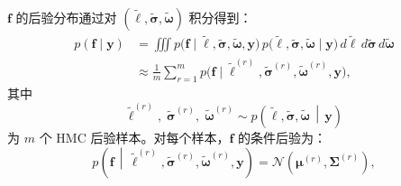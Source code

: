 \documentclass[]{interact}
\theoremstyle{plain}%
\theoremstyle{definition}
\theoremstyle{remark}
\begin{document}
$\mathbf{f}$ 的后验分布通过对 $(\tilde{\boldsymbol{\ell}}, \tilde{\boldsymbol{\sigma}}, \tilde{\boldsymbol{\omega}})$ 积分得到：
\begin{equation}
		\begin{aligned}
			p(\mathbf{f}\mid \mathbf{y})
			&= \iiint
			p\bigl(\mathbf{f}\mid \widetilde{\boldsymbol{\ell}},\widetilde{\boldsymbol{\sigma}},
			\widetilde{\boldsymbol{\omega}},\mathbf{y}\bigr)\,
			p\bigl(\widetilde{\boldsymbol{\ell}},\widetilde{\boldsymbol{\sigma}},
			\widetilde{\boldsymbol{\omega}}\mid \mathbf{y}\bigr)\,
			d\widetilde{\boldsymbol{\ell}}\,
			d\widetilde{\boldsymbol{\sigma}}\,
			d\widetilde{\boldsymbol{\omega}} \\
			&\approx \frac{1}{m}\sum_{r=1}^{m}
			p\bigl(\mathbf{f}\mid
			\widetilde{\boldsymbol{\ell}}^{(r)},
			\widetilde{\boldsymbol{\sigma}}^{(r)},
			\widetilde{\boldsymbol{\omega}}^{(r)},
			\mathbf{y}\bigr),
		\end{aligned}
\end{equation}
其中
\begin{equation}
	\widetilde{\boldsymbol{\ell}}^{(r)},\;
	\widetilde{\boldsymbol{\sigma}}^{(r)},\;
	\widetilde{\boldsymbol{\omega}}^{(r)}
	\sim
	p\!\left(
	\widetilde{\boldsymbol{\ell}},
	\widetilde{\boldsymbol{\sigma}},
	\widetilde{\boldsymbol{\omega}}
	\,\middle|\,
	\mathbf{y}
	\right)
\end{equation}
为 $m$ 个 HMC 后验样本。对每个样本，$\mathbf{f}$ 的条件后验为：
\begin{equation}
	p\!\left(
	\mathbf{f}\,\middle|\,
	\widetilde{\boldsymbol{\ell}}^{(r)},
	\widetilde{\boldsymbol{\sigma}}^{(r)},
	\widetilde{\boldsymbol{\omega}}^{(r)},
	\mathbf{y}
	\right)
	=
	\mathcal{N}\!\left(
	\boldsymbol{\mu}^{(r)},
	\boldsymbol{\Sigma}^{(r)}
	\right),
\end{equation}
\end{document}
